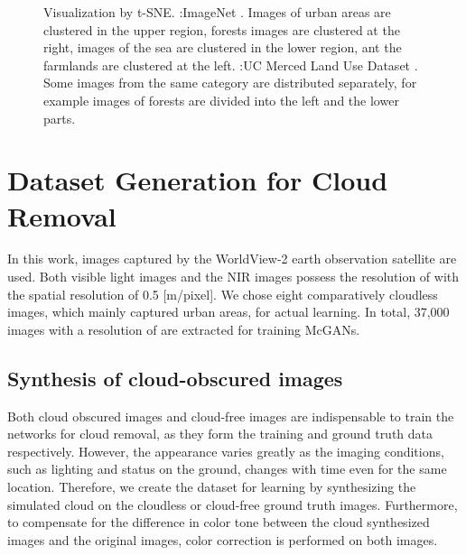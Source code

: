 \documentclass[10pt,twocolumn,letterpaper]{article}
\begin{document}
\begin{figure*}[!t]
\begin{center}


\vspace{-3mm}
\caption{Visualization by t-SNE. \protect{}:ImageNet \protect\cite{deng2009imagenet}. Images of urban areas are clustered in the upper region, forests images are clustered at the right, images of the sea are clustered in the lower region, ant the farmlands are clustered  at the left. \protect{}:UC Merced Land Use Dataset \protect\cite{yang2010bag}. Some images from the same category are distributed separately, for example images of forests are divided into the left and  the lower parts. }
\label{fig:t-sne}

\end{center}
\end{figure*}

\section{Dataset Generation for Cloud Removal}
\label{sec:cloud_dataset}
In this work, images captured by the WorldView-2 earth observation satellite are used. Both visible light images and the NIR images possess the resolution of  with the spatial resolution of 0.5 [m/pixel].  We chose eight comparatively cloudless images, which mainly captured urban areas, for actual learning.  In total, 37,000 images with a resolution of  are extracted for training McGANs.

\subsection{Synthesis of cloud-obscured images}
Both cloud obscured images and cloud-free images are indispensable  to train the networks for cloud removal, as they form the training and  ground truth data respectively. However, the appearance varies greatly as the imaging conditions, such as lighting and status on the ground, changes with time even for the same location. Therefore, we create the dataset for learning by synthesizing the simulated cloud on the cloudless or  cloud-free ground truth images. Furthermore, to compensate for the difference in color tone between the cloud synthesized images and the original images, color correction \cite{hunt2005reproduction,egst20141035} is performed on both images.
\end{document}
